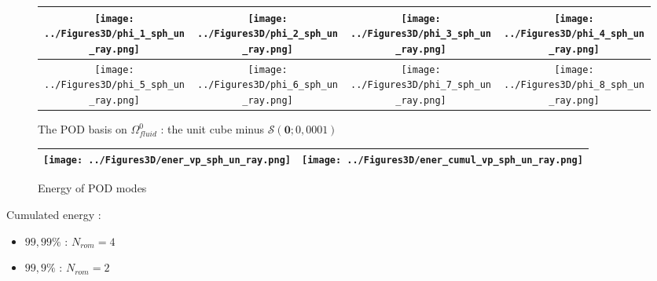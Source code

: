 

\begin{figure}[H]%
%
\begin{center}
\begin{tabular}{|c|c|c|c|}
\hline
\texttt{[image: ../Figures3D/phi\_1\_sph\_un\_ray.png]}%
&%
\texttt{[image: ../Figures3D/phi\_2\_sph\_un\_ray.png]}%
&%
\texttt{[image: ../Figures3D/phi\_3\_sph\_un\_ray.png]}%
&%
\texttt{[image: ../Figures3D/phi\_4\_sph\_un\_ray.png]}%
\\
\hline
\texttt{[image: ../Figures3D/phi\_5\_sph\_un\_ray.png]}%
&%
\texttt{[image: ../Figures3D/phi\_6\_sph\_un\_ray.png]}%
&%
\texttt{[image: ../Figures3D/phi\_7\_sph\_un\_ray.png]}%
&%
\texttt{[image: ../Figures3D/phi\_8\_sph\_un\_ray.png]}%
\\
\hline
\end{tabular}
\end{center}
%
\caption{The POD basis on $\Omega_{fluid}^0$ : the unit cube minus $\mathcal{S}(\mathbf{0};0,0001)$}
\end{figure}

\begin{figure}[H]
\begin{center}
\begin{tabular}{|c|c|}
\hline
\texttt{[image: ../Figures3D/ener\_vp\_sph\_un\_ray.png]}
&%
\texttt{[image: ../Figures3D/ener\_cumul\_vp\_sph\_un\_ray.png]}
\\ \hline
\end{tabular}
\end{center}
\caption{Energy of POD modes}
\end{figure}

\begin{multicols}{2}
Cumulated energy :

\columnbreak
\begin{itemize}
\item $99,99\%$ : $N_{rom}=4$
\item $99,9\%$ : $N_{rom}=2$
\end{itemize}
%
\end{multicols}

